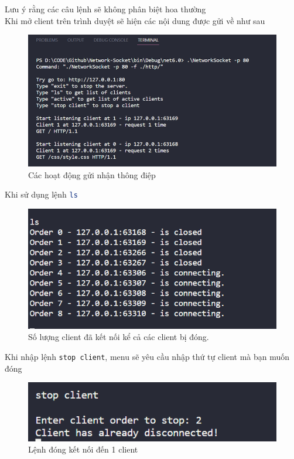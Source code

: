 \documentclass[14pt, a4paper]{extarticle}
\newcommand{\shell}[1]{\lstinline[language=bash, basicstyle=\color{orange!40!black}\large\ttfamily,
keywordstyle=\color{blue},
commentstyle=\color{green!50!black},]{#1}}
\begin{document}
Lưu ý rằng các câu lệnh sẽ không phân biệt hoa thường\\

Khi mở client trên trình duyệt sẽ hiện các nội dung được gửi về như sau\\
\begin{figure}[H]
    \begin{center}
        \includegraphics{PicGuide/Success.png}
        \caption{Các hoạt động gửi nhận thông điệp}
    \end{center}
\end{figure}
Khi sử dụng lệnh \shell{ls}\\
\begin{figure}[H]
    \begin{center}
        \includegraphics{PicGuide/LS.png}
        \caption{Số lượng client đã kết nối kể cả các client bị đóng.}
    \end{center}
\end{figure}
Khi nhập lệnh \shell{stop client}, menu sẽ yêu cầu nhập thứ tự client mà bạn muốn đóng\\
\begin{figure}[H]
    \begin{center}
        \includegraphics{PicGuide/Stop Client.png}
        \caption{Lệnh đóng kết nối đến 1 client}
    \end{center}
\end{figure}
\end{document}
